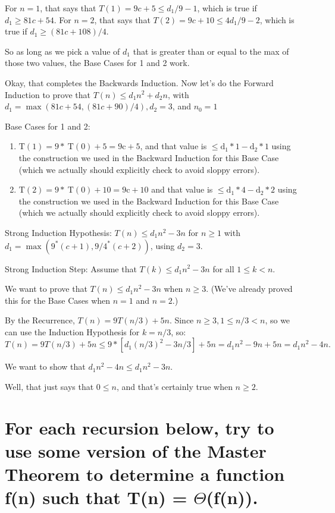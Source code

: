 \documentclass[a4paper]{article}
\begin{document}
For $n=1$,
that says that $T(1)=9 c+5 \leq d_1 / 9-1$, which is true if $d_1 \geq 81 c+54$. For $n=2$,
that says that $T(2)=9 c+10 \leq 4 d_1 / 9-2$, which is true if $d_1 \geq(81 c+108) / 4$.

So as long as we pick a value of $d_1$ that is greater than or equal to the max of those two values, the Base Cases for 1 and 2 work.

Okay, that completes the Backwards Induction. Now let's do the Forward Induction to prove that $T(n) \leq d_1 n^2+d_2 n$,
with $d_1=\max (81 c+54,(81 c+90) / 4), d_2=3$, and $n_0=1$

Base Cases for 1 and 2:
\begin{enumerate}
\item $\mathrm{T}(1)=9 * \mathrm{~T}(0)+5=9 \mathrm{c}+5$, and that value is $\leq \mathrm{d}_1 * 1-\mathrm{d}_2 * 1$ using the construction we used in the Backward Induction for this Base Case (which we actually should explicitly check to avoid sloppy errors).
\item $\mathrm{T}(2)=9 * \mathrm{~T}(0)+10=9 \mathrm{c}+10$ and that value is $\leq \mathrm{d}_1 * 4-\mathrm{d}_2 * 2$ using the construction we used in the Backward Induction for this Base Case (which we actually should explicitly check to avoid sloppy errors).
\end{enumerate}
Strong Induction Hypothesis: $T(n) \leq d_1 n^2-3 n$ for $n \geq 1$
with $d_1=\max \left(9^*(c+1), 9 / 4^*(c+2)\right)$, using $d_2=3$.

Strong Induction Step:
Assume that $T(k) \leq d_1 n^2-3 n$ for all $1 \leq k<n$.

We want to prove that $T(n) \leq d_1 n^2-3 n$ when $n \geq 3$.
(We've already proved this for the Base Cases when $n=1$ and $n=2$.)

By the Recurrence, $T(n)=9 T(n / 3)+5 n$.
Since $n \geq 3,1 \leq n / 3<n$, so we can use the Induction Hypothesis for $k=n / 3$, so:
$$
T(n)=9 T(n / 3)+5 n \leq 9 *\left[d_1(n / 3)^2-3 n / 3\right]+5 n=d_1 n^2-9 n+5 n=d_1 n^2-4 n \text {. }
$$

We want to show that $d_1 n^2-4 n \leq d_1 n^2-3 n$.

Well, that just says that $0 \leq n$, and that's certainly true when $n \geq 2$.
\section{For each recursion below, try to use some version of the Master Theorem to determine a function f(n) such that T(n) = $\Theta$(f(n)).}
\end{document}
